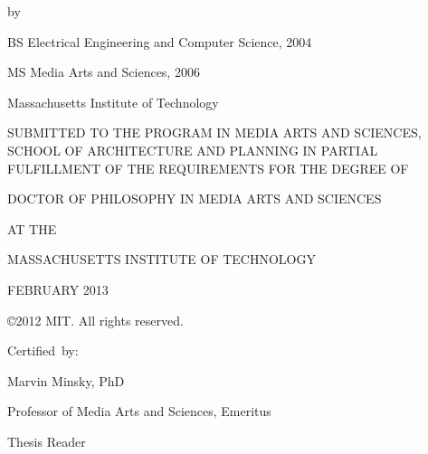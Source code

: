 \thispagestyle{empty}

\cleardoublepage

\begin{addmargin}[1cm]{-2cm}
\begin{center}
    \begingroup
        \color{Maroon}\spacedallcaps{\myTitle}
    \endgroup

    \vspace{2mm}

    by

    \vspace{2mm}

    \myName

    \vspace{6mm}
    
    BS Electrical Engineering and Computer Science, 2004
    
    MS Media Arts and Sciences, 2006

    Massachusetts Institute of Technology
    
    \vspace{6mm}

 SUBMITTED TO THE PROGRAM IN MEDIA ARTS AND SCIENCES, SCHOOL OF
 ARCHITECTURE AND PLANNING IN PARTIAL FULFILLMENT OF THE REQUIREMENTS
 FOR THE DEGREE OF

    \vspace{6mm}

DOCTOR OF PHILOSOPHY IN MEDIA ARTS AND SCIENCES

AT THE

MASSACHUSETTS INSTITUTE OF TECHNOLOGY

    \vspace{6mm}

FEBRUARY 2013

    \vspace{6mm}

\copyright 2012 MIT.  All rights reserved.

\end{center}        


\begin{flushright}
  \vspace{15mm}

  Certified~by:\hspace{0.5cm}~\makebox[2.75in]{\hrulefill}
  
Marvin Minsky, PhD

Professor of Media Arts and Sciences, Emeritus

Thesis Reader

\end{flushright}

\end{addmargin}
